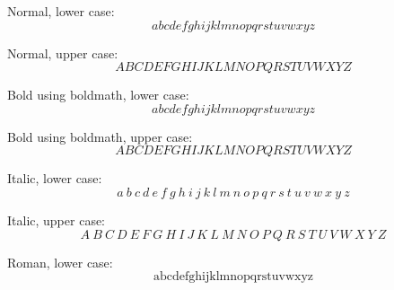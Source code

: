 Normal, lower case:
\begin{dmath}[compact,spread={1.250000\baselineskip}] a  b  c  d  e  f  g  h  i  j  k  l  m  n  o  p  q  r  s  t  u  v  w  x  y  z \end{dmath}

Normal, upper case:
\begin{dmath}[compact,spread={1.250000\baselineskip}] A  B  C  D  E  F  G  H  I  J  K  L  M  N  O  P  Q  R  S  T  U  V  W  X  Y  Z   \end{dmath}

Bold using boldmath, lower case:\boldmath
\begin{dmath}[compact,spread={1.250000\baselineskip}] a  b  c  d  e  f  g  h  i  j  k  l  m  n  o  p  q  r  s  t  u  v  w  x  y  z \end{dmath}\unboldmath

Bold using boldmath, upper case:\boldmath
\begin{dmath}[compact,spread={1.250000\baselineskip}] A  B  C  D  E  F  G  H  I  J  K  L  M  N  O  P  Q  R  S  T  U  V  W  X  Y  Z   \end{dmath}\unboldmath


Italic, lower case:
\begin{dmath}[compact,spread={1.250000\baselineskip}] \mathit{a}~\mathit{b}~\mathit{c}~\mathit{d}~\mathit{e}~\mathit{f}~\mathit{g}~\mathit{h}~\mathit{i}~\mathit{j}~\mathit{k}~\mathit{l}~\mathit{m}~\mathit{n}~\mathit{o}~\mathit{p}~\mathit{q}~\mathit{r}~\mathit{s}~\mathit{t}~\mathit{u}~\mathit{v}~\mathit{w}~\mathit{x}~\mathit{y}~\mathit{z} \end{dmath}

Italic, upper case:
\begin{dmath}[compact,spread={1.250000\baselineskip}] \mathit{A}~\mathit{B}~\mathit{C}~\mathit{D}~\mathit{E}~\mathit{F}~\mathit{G}~\mathit{H}~\mathit{I}~\mathit{J}~\mathit{K}~\mathit{L}~\mathit{M}~\mathit{N}~\mathit{O}~\mathit{P}~\mathit{Q}~\mathit{R}~\mathit{S}~\mathit{T}~\mathit{U}~\mathit{V}~\mathit{W}~\mathit{X}~\mathit{Y}~\mathit{Z} \end{dmath}

Roman, lower case:
\begin{dmath}[compact,spread={1.250000\baselineskip}] \mathrm{a}  \mathrm{b}  \mathrm{c}  \mathrm{d}  \mathrm{e}  \mathrm{f}  \mathrm{g}  \mathrm{h}  \mathrm{i}  \mathrm{j}  \mathrm{k}  \mathrm{l}  \mathrm{m}  \mathrm{n}  \mathrm{o}  \mathrm{p}  \mathrm{q}  \mathrm{r}  \mathrm{s}  \mathrm{t}  \mathrm{u}  \mathrm{v}  \mathrm{w}  \mathrm{x}  \mathrm{y}  \mathrm{z} \end{dmath}

